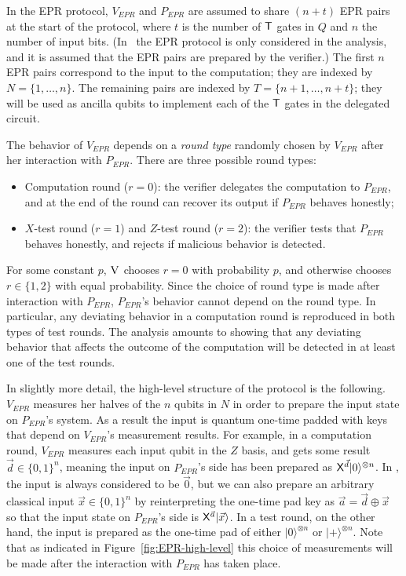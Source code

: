 \documentclass[11pt,letter]{article}
\theoremstyle{remark}
\theoremstyle{definition}
\newcommand{\ket}[1]{|#1\rangle}
\newcommand{\ver}{\textsc{V}}
\begin{document}
In the EPR protocol, $V_{EPR}$ and $P_{EPR}$ are assumed to share $(n+t)$ EPR pairs at the start of the protocol, where $t$ is the number of $\sf T$ gates in $Q$ and $n$ the number of input bits. (In~\cite{broadbent15howtoverify} the EPR protocol is only considered in the analysis, and it is assumed that the EPR pairs are prepared by the verifier.)
 The first $n$ EPR pairs correspond to the input to the computation; they are indexed by $N=\{1,\dots,n\}$. The remaining pairs are indexed by $T=\{n+1,\dots,n+t\}$; they will be used as ancilla qubits to  implement each of the $\sf T$ gates in the delegated circuit. 

The behavior of $V_{EPR}$ depends on a \emph{round type} randomly chosen by $V_{EPR}$ after her interaction with $P_{EPR}$. There are three possible round types:
\begin{itemize}[nolistsep]
\item Computation round ($r=0$): the verifier delegates the computation to $P_{EPR}$, and at the end of the round can recover its output if $P_{EPR}$ behaves honestly;
\item $X$-test round ($r=1$) and $Z$-test round ($r=2$): the verifier tests that  $P_{EPR}$  behaves honestly, and rejects if malicious behavior is detected.
\end{itemize}
For some constant $p$, $\ver$ chooses $r=0$ with probability $p$, and otherwise chooses $r\in\{1,2\}$ with equal probability. Since the choice of round type is made after interaction with $P_{EPR}$, $P_{EPR}$'s behavior cannot depend on the round type. In particular, any deviating behavior in a computation round is reproduced in both types of test rounds. The analysis amounts to showing that any deviating behavior that affects the outcome of the computation will be detected in at least one of the test rounds. 

In slightly more detail, the high-level structure of the protocol is the following. $V_{EPR}$ measures her halves of the $n$ qubits in $N$ in order to prepare the input state on $P_{EPR}$'s system. As a result the input is quantum one-time padded with keys that depend on $V_{EPR}$'s measurement results. For example, in a computation round, $V_{EPR}$ measures each input qubit in the $Z$ basis, and gets some result $\vec{d}\in\{0,1\}^n$, meaning the input on $P_{EPR}$'s side has been prepared as ${\sf X}^{\vec{d}}\ket{0}^{\otimes n}$. In \cite{broadbent15howtoverify}, the input is always considered to be $\vec{0}$, but we can also prepare an arbitrary classical input $\vec{x}\in\{0,1\}^n$ by reinterpreting the one-time pad key as $\vec{a}=\vec{d}\oplus \vec{x}$ so that the input state on $P_{EPR}$'s side is ${\sf X}^{\vec{a}}\ket{\vec{x}}$. In a test round, on the other hand, the input is prepared as the one-time pad of either $\ket{0}^{\otimes n}$ or $\ket{+}^{\otimes n}$. Note that as indicated in Figure~\ref{fig:EPR-high-level} this choice of measurements will be made after the interaction with $P_{EPR}$ has taken place.
\end{document}
